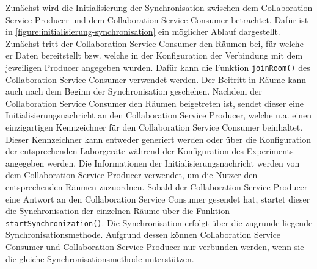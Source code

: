 Zunächst wird die Initialisierung der Synchronisation zwischen dem Collaboration Service Producer und dem Collaboration Service Consumer betrachtet. Dafür ist in \autoref{figure:initialisierung-synchronisation} ein möglicher Ablauf dargestellt. Zunächst tritt der Collaboration Service Consumer den Räumen bei, für welche er Daten bereitstellt bzw. welche in der Konfiguration der Verbindung mit dem jeweiligen Producer angegeben wurden. Dafür kann die Funktion \texttt{joinRoom()} des Collaboration Service Consumer verwendet werden. Der Beitritt in Räume kann auch nach dem Beginn der Synchronisation geschehen. Nachdem der Collaboration Service Consumer den Räumen beigetreten ist, sendet dieser eine Initialisierungsnachricht an den Collaboration Service Producer, welche u.a. einen einzigartigen Kennzeichner für den Collaboration Service Consumer beinhaltet. Dieser Kennzeichner kann entweder generiert werden oder über die Konfiguration der entsprechenden Laborgeräte während der Konfiguration des Experiments angegeben werden. Die Informationen der Initialisierungsnachricht werden von dem Collaboration Service Producer verwendet, um die Nutzer den entsprechenden Räumen zuzuordnen. Sobald der Collaboration Service Producer eine Antwort an den Collaboration Service Consumer gesendet hat, startet dieser die Synchronisation der einzelnen Räume über die Funktion \texttt{startSynchronization()}. Die Synchronisation erfolgt über die zugrunde liegende Synchronisationsmethode. Aufgrund dessen können Collaboration Service Consumer und Collaboration Service Producer nur verbunden werden, wenn sie die gleiche Synchronisationsmethode unterstützen.

